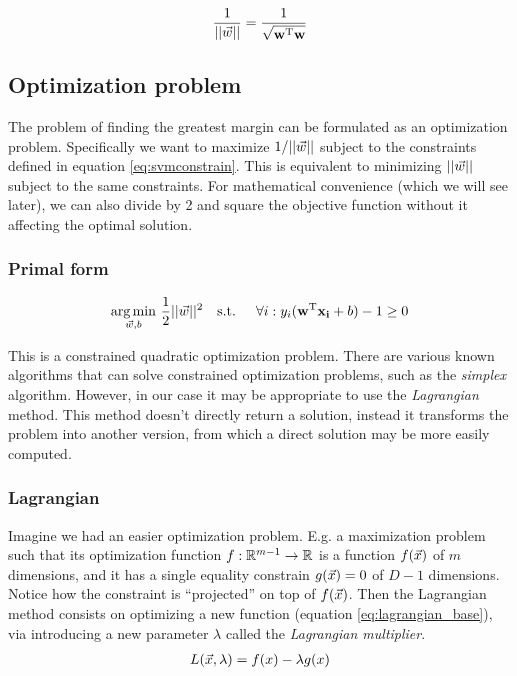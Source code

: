 \begin{align}
    \frac{1}{||\vec{w}||} = \frac{1}{\sqrt{\mathbf{w}^{\text{T}} \mathbf{w}}}
\end{align}

\subsection{Optimization problem}

The problem of finding the greatest margin can be formulated as an optimization problem. Specifically we want to maximize $1/||\vec{w}||$ subject to the constraints defined in equation \ref{eq:svmconstrain}. This is equivalent to minimizing $||\vec{w}||$ subject to the same constraints. For mathematical convenience (which we will see later), we can also divide by 2 and square the objective function without it affecting the optimal solution.

\subsubsection*{Primal form}
\begin{align}\label{eq:svm_primal} 
    \underset{\vec{w}, b}{\text{arg} \min}\ \frac{1}{2} ||\vec{w}||^2 \text{\quad s.t. \quad} \forall i : y_i (\mathbf{w}^{\text{T}} \mathbf{x_i} + b) - 1 \ge 0
\end{align}

This is a constrained quadratic optimization problem. There are various known algorithms that can solve constrained optimization problems, such as the \emph{simplex} algorithm. However, in our case it may be appropriate to use the \emph{Lagrangian} method. This method doesn't directly return a solution, instead it transforms the problem into another version, from which a direct solution may be more easily computed.

\subsubsection*{Lagrangian}

Imagine we had an easier optimization problem. E.g. a maximization pro\-blem such that its optimization function $f : \mathbb{R}^{m-1} \rightarrow \mathbb{R}$ is a function $f(\vec{x})$ of $m$ dimensions, and it has a single equality constrain $g(\vec{x}) = 0$ of $D - 1$ dimensions. Notice how the constraint is “projected” on top of $f(\vec{x})$. Then the Lagrangian method consists on optimizing a new function (equation \ref{eq:lagrangian_base}), via introducing a new pa\-ram\-e\-ter $\lambda$ called the \emph{Lagrangian multiplier}. 
\begin{align}\label{eq:lagrangian_base} 
    L(\vec{x}, \lambda) = f(x) - \lambda g(x)
\end{align}

